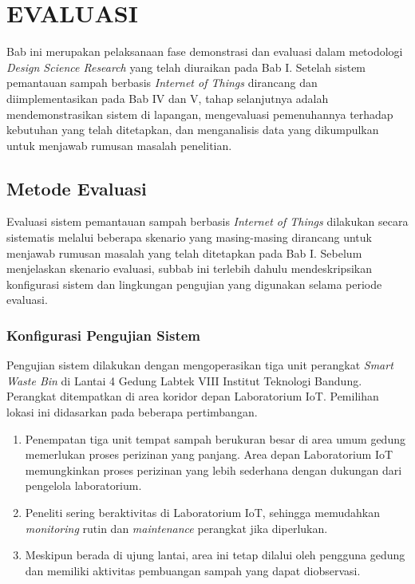\cleardoublepage
\chapter{EVALUASI}
\label{chap:evaluasi}

Bab ini merupakan pelaksanaan fase demonstrasi dan evaluasi dalam metodologi \textit{Design Science Research} yang telah diuraikan pada Bab I. Setelah sistem pemantauan sampah berbasis \textit{Internet of Things} dirancang dan diimplementasikan pada Bab IV dan V, tahap selanjutnya adalah mendemonstrasikan sistem di lapangan, mengevaluasi pemenuhannya terhadap kebutuhan yang telah ditetapkan, dan menganalisis data yang dikumpulkan untuk menjawab rumusan masalah penelitian.

\section{Metode Evaluasi}
\label{sec:metode-evaluasi}

Evaluasi sistem pemantauan sampah berbasis \textit{Internet of Things} dilakukan secara sistematis melalui beberapa skenario yang masing-masing dirancang untuk menjawab rumusan masalah yang telah ditetapkan pada Bab I. Sebelum menjelaskan skenario evaluasi, subbab ini terlebih dahulu mendeskripsikan konfigurasi sistem dan lingkungan pengujian yang digunakan selama periode evaluasi.

\subsection{Konfigurasi Pengujian Sistem}

Pengujian sistem dilakukan dengan mengoperasikan tiga unit perangkat \textit{Smart Waste Bin} di Lantai 4 Gedung Labtek VIII Institut Teknologi Bandung. Perangkat ditempatkan di area koridor depan Laboratorium IoT. Pemilihan lokasi ini didasarkan pada beberapa pertimbangan.

\begin{enumerate}
  \item Penempatan tiga unit tempat sampah berukuran besar di area umum gedung memerlukan proses perizinan yang panjang. Area depan Laboratorium IoT memungkinkan proses perizinan yang lebih sederhana dengan dukungan dari pengelola laboratorium.
  \item Peneliti sering beraktivitas di Laboratorium IoT, sehingga memudahkan \textit{monitoring} rutin dan \textit{maintenance} perangkat jika diperlukan.
  \item Meskipun berada di ujung lantai, area ini tetap dilalui oleh pengguna gedung dan memiliki aktivitas pembuangan sampah yang dapat diobservasi.
\end{enumerate}


